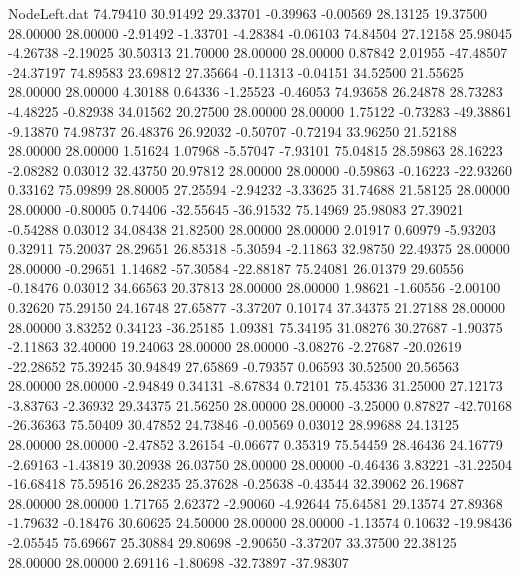 \begin{filecontents}{NodeLeft.dat}
  74.79410   30.91492   29.33701    -0.39963   -0.00569   28.13125   19.37500   28.00000   28.00000   -2.91492   -1.33701   -4.28384   -0.06103
  74.84504   27.12158   25.98045    -4.26738   -2.19025   30.50313   21.70000   28.00000   28.00000    0.87842    2.01955  -47.48507  -24.37197
  74.89583   23.69812   27.35664    -0.11313   -0.04151   34.52500   21.55625   28.00000   28.00000    4.30188    0.64336   -1.25523   -0.46053
  74.93658   26.24878   28.73283    -4.48225   -0.82938   34.01562   20.27500   28.00000   28.00000    1.75122   -0.73283  -49.38861   -9.13870
  74.98737   26.48376   26.92032    -0.50707   -0.72194   33.96250   21.52188   28.00000   28.00000    1.51624    1.07968   -5.57047   -7.93101
  75.04815   28.59863   28.16223    -2.08282    0.03012   32.43750   20.97812   28.00000   28.00000   -0.59863   -0.16223  -22.93260    0.33162
  75.09899   28.80005   27.25594    -2.94232   -3.33625   31.74688   21.58125   28.00000   28.00000   -0.80005    0.74406  -32.55645  -36.91532
  75.14969   25.98083   27.39021    -0.54288    0.03012   34.08438   21.82500   28.00000   28.00000    2.01917    0.60979   -5.93203    0.32911
  75.20037   28.29651   26.85318    -5.30594   -2.11863   32.98750   22.49375   28.00000   28.00000   -0.29651    1.14682  -57.30584  -22.88187
  75.24081   26.01379   29.60556    -0.18476    0.03012   34.66563   20.37813   28.00000   28.00000    1.98621   -1.60556   -2.00100    0.32620
  75.29150   24.16748   27.65877    -3.37207    0.10174   37.34375   21.27188   28.00000   28.00000    3.83252    0.34123  -36.25185    1.09381
  75.34195   31.08276   30.27687    -1.90375   -2.11863   32.40000   19.24063   28.00000   28.00000   -3.08276   -2.27687  -20.02619  -22.28652
  75.39245   30.94849   27.65869    -0.79357    0.06593   30.52500   20.56563   28.00000   28.00000   -2.94849    0.34131   -8.67834    0.72101
  75.45336   31.25000   27.12173    -3.83763   -2.36932   29.34375   21.56250   28.00000   28.00000   -3.25000    0.87827  -42.70168  -26.36363
  75.50409   30.47852   24.73846    -0.00569    0.03012   28.99688   24.13125   28.00000   28.00000   -2.47852    3.26154   -0.06677    0.35319
  75.54459   28.46436   24.16779    -2.69163   -1.43819   30.20938   26.03750   28.00000   28.00000   -0.46436    3.83221  -31.22504  -16.68418
  75.59516   26.28235   25.37628    -0.25638   -0.43544   32.39062   26.19687   28.00000   28.00000    1.71765    2.62372   -2.90060   -4.92644
  75.64581   29.13574   27.89368    -1.79632   -0.18476   30.60625   24.50000   28.00000   28.00000   -1.13574    0.10632  -19.98436   -2.05545
  75.69667   25.30884   29.80698    -2.90650   -3.37207   33.37500   22.38125   28.00000   28.00000    2.69116   -1.80698  -32.73897  -37.98307

\end{filecontents}
